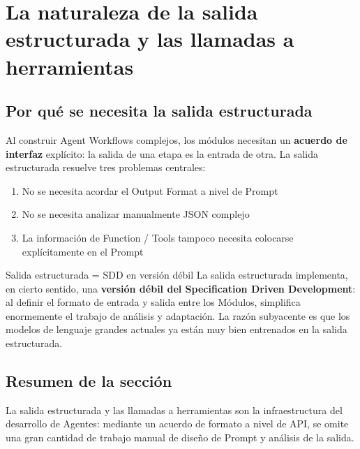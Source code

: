 \section{La naturaleza de la salida estructurada y las llamadas a herramientas}

\subsection{Por qué se necesita la salida estructurada}

Al construir Agent Workflows complejos, los módulos necesitan un \textbf{acuerdo de interfaz} explícito: la salida de una etapa es la entrada de otra. La salida estructurada resuelve tres problemas centrales:

\begin{enumerate}
    \item No se necesita acordar el Output Format a nivel de Prompt
    \item No se necesita analizar manualmente JSON complejo
    \item La información de Function / Tools tampoco necesita colocarse explícitamente en el Prompt
\end{enumerate}

\begin{importantbox}{Salida estructurada = SDD en versión débil}
La salida estructurada implementa, en cierto sentido, una \textbf{versión débil del Specification Driven Development}: al definir el formato de entrada y salida entre los Módulos, simplifica enormemente el trabajo de análisis y adaptación. La razón subyacente es que los modelos de lenguaje grandes actuales ya están muy bien entrenados en la salida estructurada.
\end{importantbox}

\subsection{Resumen de la sección}

La salida estructurada y las llamadas a herramientas son la infraestructura del desarrollo de Agentes: mediante un acuerdo de formato a nivel de API, se omite una gran cantidad de trabajo manual de diseño de Prompt y análisis de la salida.

